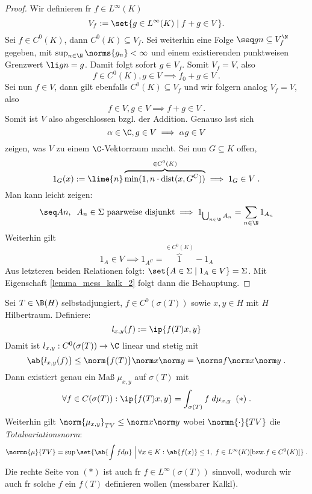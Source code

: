 \begin{proof}
	Wir definieren f\us r \(f\in L^\infty(K)\)
	\[V_f := \set{g\in L^\infty(K)\;\vert\; f+g \in V}.\]
	Sei \(f\in C^0(K)\), dann \(C^0(K)\subseteq V_f\). Sei weiterhin eine Folge \(\seq gn \subseteq V_f^\N\) gegeben, mit \(\sup_{n\in\N} \norms{g_n} < \infty\) und einem existierenden punktweisen Grenzwert \(\li gn = g\). Damit folgt sofort \(g\in V_f\). Somit \(V_f = V\), also 
	\[f \in C^0(K), g\in V \implies f_0 + g \in V\;.\]
	Sei nun \(f\in V\), dann gilt ebenfalls \(C^0(K) \subseteq V_f\) und wir folgern analog \(V_f = V\), also 
	\[f\in V, g\in V \implies f + g \in V\;.\] 
	Somit ist $V$ also abgeschlossen bzgl. der Addition. Genauso l\as sst sich \[\alpha \in \C, g\in V \implies \alpha g \in V\] zeigen, was $V$ zu einem \(\C\)-Vektorraum macht.
	Sei nun \(G\subseteq K\) offen, 
	\[1_G(x) := \lime{n} \overbrace{\min(1,n\cdot \text{dist}(x, G^C))}^{\in C^0(K)} \implies 1_G \in V\;.\]
	Man kann leicht zeigen:
	\[\seq An,\;\; A_n \in \Sigma \text{ paarweise disjunkt} \implies 1_{\bigcup_{n\in\N} A_n} = \sum_{n\in\N} 1_{A_n}\]
	Weiterhin gilt
	\[1_A\in V \implies 1_{A^C} = \overbrace{1}^{\in C^0(K)}-1_A\]
	Aus letzteren beiden Relationen folgt: \(\set{A\in \Sigma \;\vert\; 1_A\in V} = \Sigma\). Mit Eigenschaft \ref{lemma_mess_kalk_2} folgt dann die Behauptung.
\end{proof}

\begin{rem}
	Sei \(T\in \B(H)\) selbstadjungiert, \(f\in C^0(\sigma(T))\) sowie \(x,y \in H\) mit $H$ Hilbertraum. Definiere:
	\[l_{x,y}(f):= \ip{f(T)x,y}\]
	Damit ist \(l_{x,y}:C^0(\sigma(T)) \to \C\) linear und stetig mit
	\[\ab{l_{x,y}(f)} \leq \norm{f(T)} \norm x\norm y = \norms f \norm x \norm y\;.\]
	Dann existiert genau ein Ma\ss{} $\mu_{x,y}$ auf \(\sigma(T)\) mit 
	\[\forall f \in C(\sigma(T)): \ip{f(T)x,y} = \int_{\sigma(T)} f \;d\mu_{x,y}\;\;(*)\;.\]
	Weiterhin gilt \(\norm{\mu_{x,y}}_{TV} \leq \norm x\norm y\) wobei $\normn{\cdot}{TV}$ die \textit{Totalvariationsnorm}:
	\[\normn{\mu}{TV} = \sup\set{\ab{\int fd\mu}\;\Big\vert\; \forall x \in K: \ab{f(x)} \leq 1, \;f \in L^\infty(K)[\text{bzw.} f\in C^0(K)]}\;.\]
	Die rechte Seite von $(*)$ ist auch f\us r $f\in L^\infty(\sigma(T))$ sinnvoll, wodurch wir auch f\us r solche $f$ ein $f(T)$ definieren wollen (messbarer Kalk\us l).
	\label{rem_mess_kalk}
\end{rem}

